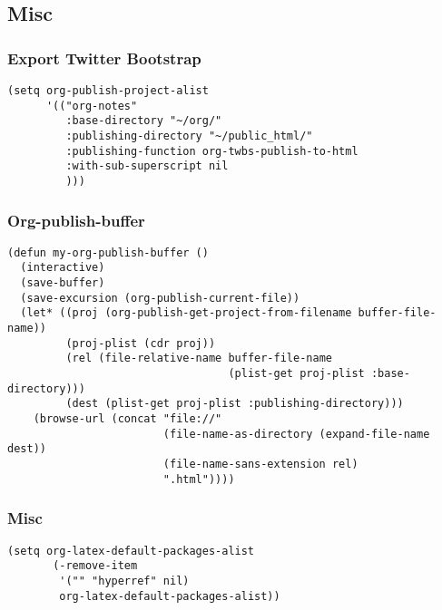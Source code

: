 \documentclass[11pt]{article}
\begin{document}
\subsection{Misc}
\label{sec:orgheadline46}
\subsubsection{Export Twitter Bootstrap}
\label{sec:orgheadline43}
\begin{verbatim}
(setq org-publish-project-alist
      '(("org-notes"
         :base-directory "~/org/"
         :publishing-directory "~/public_html/"
         :publishing-function org-twbs-publish-to-html
         :with-sub-superscript nil
         )))
\end{verbatim}
\subsubsection{Org-publish-buffer}
\label{sec:orgheadline44}
\begin{verbatim}
(defun my-org-publish-buffer ()
  (interactive)
  (save-buffer)
  (save-excursion (org-publish-current-file))
  (let* ((proj (org-publish-get-project-from-filename buffer-file-name))
         (proj-plist (cdr proj))
         (rel (file-relative-name buffer-file-name
                                  (plist-get proj-plist :base-directory)))
         (dest (plist-get proj-plist :publishing-directory)))
    (browse-url (concat "file://"
                        (file-name-as-directory (expand-file-name dest))
                        (file-name-sans-extension rel)
                        ".html"))))
\end{verbatim}
\subsubsection{Misc}
\label{sec:orgheadline45}
\begin{verbatim}
(setq org-latex-default-packages-alist
       (-remove-item
        '("" "hyperref" nil)
        org-latex-default-packages-alist))
\end{verbatim}
\end{document}
